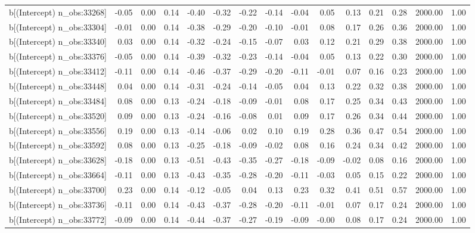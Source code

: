 \begin{table}[ht]
\begin{tabular}{rrrrrrrrrrrrrrr}
  b[(Intercept) n\_obs:33268] & -0.05 & 0.00 & 0.14 & -0.40 & -0.32 & -0.22 & -0.14 & -0.04 & 0.05 & 0.13 & 0.21 & 0.28 & 2000.00 & 1.00 \\ 
  b[(Intercept) n\_obs:33304] & -0.01 & 0.00 & 0.14 & -0.38 & -0.29 & -0.20 & -0.10 & -0.01 & 0.08 & 0.17 & 0.26 & 0.36 & 2000.00 & 1.00 \\ 
  b[(Intercept) n\_obs:33340] & 0.03 & 0.00 & 0.14 & -0.32 & -0.24 & -0.15 & -0.07 & 0.03 & 0.12 & 0.21 & 0.29 & 0.38 & 2000.00 & 1.00 \\ 
  b[(Intercept) n\_obs:33376] & -0.05 & 0.00 & 0.14 & -0.39 & -0.32 & -0.23 & -0.14 & -0.04 & 0.05 & 0.13 & 0.22 & 0.30 & 2000.00 & 1.00 \\ 
  b[(Intercept) n\_obs:33412] & -0.11 & 0.00 & 0.14 & -0.46 & -0.37 & -0.29 & -0.20 & -0.11 & -0.01 & 0.07 & 0.16 & 0.23 & 2000.00 & 1.00 \\ 
  b[(Intercept) n\_obs:33448] & 0.04 & 0.00 & 0.14 & -0.31 & -0.24 & -0.14 & -0.05 & 0.04 & 0.13 & 0.22 & 0.32 & 0.38 & 2000.00 & 1.00 \\ 
  b[(Intercept) n\_obs:33484] & 0.08 & 0.00 & 0.13 & -0.24 & -0.18 & -0.09 & -0.01 & 0.08 & 0.17 & 0.25 & 0.34 & 0.43 & 2000.00 & 1.00 \\ 
  b[(Intercept) n\_obs:33520] & 0.09 & 0.00 & 0.13 & -0.24 & -0.16 & -0.08 & 0.01 & 0.09 & 0.17 & 0.26 & 0.34 & 0.44 & 2000.00 & 1.00 \\ 
  b[(Intercept) n\_obs:33556] & 0.19 & 0.00 & 0.13 & -0.14 & -0.06 & 0.02 & 0.10 & 0.19 & 0.28 & 0.36 & 0.47 & 0.54 & 2000.00 & 1.00 \\ 
  b[(Intercept) n\_obs:33592] & 0.08 & 0.00 & 0.13 & -0.25 & -0.18 & -0.09 & -0.02 & 0.08 & 0.16 & 0.24 & 0.34 & 0.42 & 2000.00 & 1.00 \\ 
  b[(Intercept) n\_obs:33628] & -0.18 & 0.00 & 0.13 & -0.51 & -0.43 & -0.35 & -0.27 & -0.18 & -0.09 & -0.02 & 0.08 & 0.16 & 2000.00 & 1.00 \\ 
  b[(Intercept) n\_obs:33664] & -0.11 & 0.00 & 0.13 & -0.43 & -0.35 & -0.28 & -0.20 & -0.11 & -0.03 & 0.05 & 0.15 & 0.22 & 2000.00 & 1.00 \\ 
  b[(Intercept) n\_obs:33700] & 0.23 & 0.00 & 0.14 & -0.12 & -0.05 & 0.04 & 0.13 & 0.23 & 0.32 & 0.41 & 0.51 & 0.57 & 2000.00 & 1.00 \\ 
  b[(Intercept) n\_obs:33736] & -0.11 & 0.00 & 0.14 & -0.43 & -0.37 & -0.28 & -0.20 & -0.11 & -0.01 & 0.07 & 0.17 & 0.24 & 2000.00 & 1.00 \\ 
  b[(Intercept) n\_obs:33772] & -0.09 & 0.00 & 0.14 & -0.44 & -0.37 & -0.27 & -0.19 & -0.09 & -0.00 & 0.08 & 0.17 & 0.24 & 2000.00 & 1.00 \\ 

\end{tabular}
\end{table}
